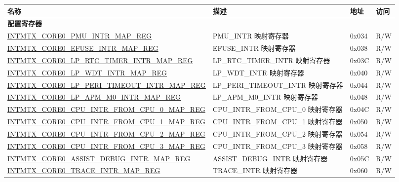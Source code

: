 \begin{longtable}{ | p{10cm} | p{10cm} | p{1.3cm} | p{1cm} | }
\hline\rowcolor{lightgray}
名称 & 描述 &  地址 & 访问 \\ \hline
\endhead
\multicolumn{4}{|l|}{\textbf{配置寄存器}} \\ \hline

\hyperref[regdesc:INTMTXCORE0PMUINTRMAPREG]{INTMTX\_CORE0\_PMU\_INTR\_MAP\_REG} & PMU\_INTR 映射寄存器 & 0x034 & R/W  \\ \hline
\hyperref[regdesc:INTMTXCORE0EFUSEINTRMAPREG]{INTMTX\_CORE0\_EFUSE\_INTR\_MAP\_REG} & EFUSE\_INTR 映射寄存器 & 0x038 & R/W  \\ \hline
\hyperref[regdesc:INTMTXCORE0LPRTCTIMERINTRMAPREG]{INTMTX\_CORE0\_LP\_RTC\_TIMER\_INTR\_MAP\_REG} & LP\_RTC\_TIMER\_INTR 映射寄存器 & 0x03C & R/W  \\ \hline
\hyperref[regdesc:INTMTXCORE0LPWDTINTRMAPREG]{INTMTX\_CORE0\_LP\_WDT\_INTR\_MAP\_REG} & LP\_WDT\_INTR 映射寄存器 & 0x040 & R/W  \\ \hline
\hyperref[regdesc:INTMTXCORE0LPPERITIMEOUTINTRMAPREG]{INTMTX\_CORE0\_LP\_PERI\_TIMEOUT\_INTR\_MAP\_REG} & LP\_PERI\_TIMEOUT\_INTR 映射寄存器 & 0x044 & R/W  \\ \hline
\hyperref[regdesc:INTMTXCORE0LPAPMM0INTRMAPREG]{INTMTX\_CORE0\_LP\_APM\_M0\_INTR\_MAP\_REG} & LP\_APM\_M0\_INTR 映射寄存器 & 0x048 & R/W  \\ \hline
\hyperref[regdesc:INTMTXCORE0CPUINTRFROMCPU0MAPREG]{INTMTX\_CORE0\_CPU\_INTR\_FROM\_CPU\_0\_MAP\_REG} & CPU\_INTR\_FROM\_CPU\_0 映射寄存器 & 0x04C & R/W  \\ \hline
\hyperref[regdesc:INTMTXCORE0CPUINTRFROMCPU1MAPREG]{INTMTX\_CORE0\_CPU\_INTR\_FROM\_CPU\_1\_MAP\_REG} & CPU\_INTR\_FROM\_CPU\_1 映射寄存器 & 0x050 & R/W  \\ \hline
\hyperref[regdesc:INTMTXCORE0CPUINTRFROMCPU2MAPREG]{INTMTX\_CORE0\_CPU\_INTR\_FROM\_CPU\_2\_MAP\_REG} & CPU\_INTR\_FROM\_CPU\_2 映射寄存器 & 0x054 & R/W  \\ \hline
\hyperref[regdesc:INTMTXCORE0CPUINTRFROMCPU3MAPREG]{INTMTX\_CORE0\_CPU\_INTR\_FROM\_CPU\_3\_MAP\_REG} & CPU\_INTR\_FROM\_CPU\_3 映射寄存器 & 0x058 & R/W  \\ \hline
\hyperref[regdesc:INTMTXCORE0ASSISTDEBUGINTRMAPREG]{INTMTX\_CORE0\_ASSIST\_DEBUG\_INTR\_MAP\_REG} & ASSIST\_DEBUG\_INTR 映射寄存器 & 0x05C & R/W  \\ \hline
\hyperref[regdesc:INTMTXCORE0TRACEINTRMAPREG]{INTMTX\_CORE0\_TRACE\_INTR\_MAP\_REG} & TRACE\_INTR 映射寄存器 & 0x060 & R/W  \\ \hline

\end{longtable}
